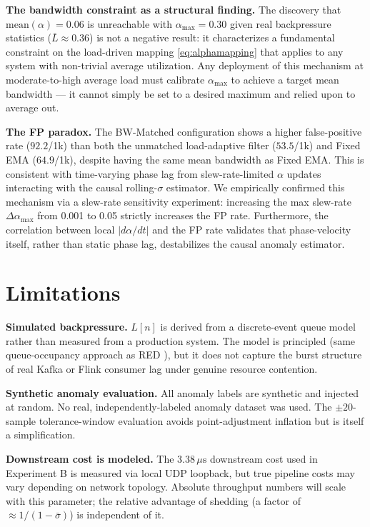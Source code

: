 \documentclass[conference]{IEEEtran}
\begin{document}
\textbf{The bandwidth constraint as a structural finding.} The discovery
that $\text{mean}(\alpha)=0.06$ is unreachable with $\alpha_\text{max}=0.30$
given real backpressure statistics ($\bar{L}\approx0.36$) is not a negative
result: it characterizes a fundamental constraint on the load-driven mapping
\eqref{eq:alphamapping} that applies to any system with non-trivial average
utilization. Any deployment of this mechanism at moderate-to-high average
load must calibrate $\alpha_\text{max}$ to achieve a target mean bandwidth —
it cannot simply be set to a desired maximum and relied upon to average out.

\textbf{The FP paradox.} The BW-Matched configuration shows a higher
false-positive rate ($92.2$/1k) than both the unmatched load-adaptive filter
($53.5$/1k) and Fixed EMA ($64.9$/1k), despite having the same mean
bandwidth as Fixed EMA. This is consistent with time-varying phase lag
from slew-rate-limited $\alpha$ updates interacting with the causal
rolling-$\sigma$ estimator. We empirically confirmed this mechanism via a slew-rate sensitivity experiment: increasing the max slew-rate $\Delta\alpha_\text{max}$ from 0.001 to 0.05 strictly increases the FP rate. Furthermore, the correlation between local $|d\alpha/dt|$ and the FP rate validates that phase-velocity itself, rather than static phase lag, destabilizes the causal anomaly estimator.

\section{Limitations}

\textbf{Simulated backpressure.} $L[n]$ is derived from a discrete-event
queue model rather than measured from a production system. The model is
principled (same queue-occupancy approach as RED \cite{red}), but it does
not capture the burst structure of real Kafka or Flink consumer lag under
genuine resource contention.

\textbf{Synthetic anomaly evaluation.} All anomaly labels are synthetic and
injected at random. No real, independently-labeled anomaly dataset was
used. The $\pm20$-sample tolerance-window evaluation avoids point-adjustment
inflation \cite{tsad_eval} but is itself a simplification.

\textbf{Downstream cost is modeled.} The $3.38\,\mu\text{s}$ downstream cost
used in Experiment B is measured via local UDP loopback, but true pipeline costs
may vary depending on network topology. Absolute throughput numbers will scale with this parameter; the
relative advantage of shedding (a factor of $\approx1/(1-\bar{\sigma})$) is
independent of it.
\end{document}
